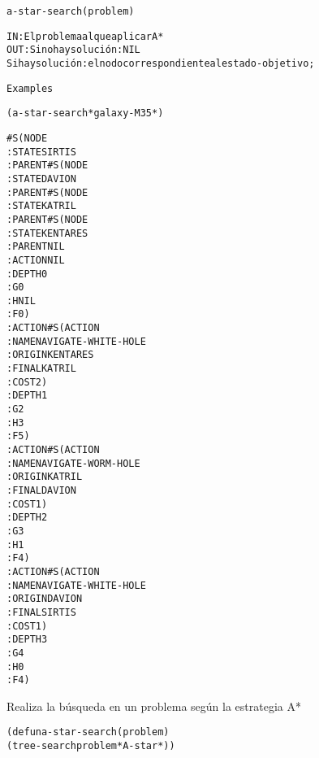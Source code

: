 \begin{aibox}{\function}
\begin{alltt}
a-star-search (problem)

  IN: El problema al que aplicar A*
  OUT: Si no hay solución: NIL
    Si hay solución: el nodo correspondiente al estado-objetivo ;

\end{alltt}
\end{aibox}

\begin{aibox}{\examples}
\begin{alltt}
Examples

(a-star-search *galaxy-M35*)

\#S(NODE
   :STATE SIRTIS
   :PARENT \#S(NODE
              :STATE DAVION
              :PARENT \#S(NODE
                         :STATE KATRIL
                         :PARENT \#S(NODE
                                    :STATE KENTARES
                                    :PARENT NIL
                                    :ACTION NIL
                                    :DEPTH 0
                                    :G 0
                                    :H NIL
                                    :F 0)
                         :ACTION \#S(ACTION
                                    :NAME NAVIGATE-WHITE-HOLE
                                    :ORIGIN KENTARES
                                    :FINAL KATRIL
                                    :COST 2)
                         :DEPTH 1
                         :G 2
                         :H 3
                         :F 5)
              :ACTION \#S(ACTION
                         :NAME NAVIGATE-WORM-HOLE
                         :ORIGIN KATRIL
                         :FINAL DAVION
                         :COST 1)
              :DEPTH 2
              :G 3
              :H 1
              :F 4)
   :ACTION \#S(ACTION
              :NAME NAVIGATE-WHITE-HOLE
              :ORIGIN DAVION
              :FINAL SIRTIS
              :COST 1)
   :DEPTH 3
   :G 4
   :H 0
   :F 4)


\end{alltt}
\end{aibox}

\begin{aibox}{\comments}
Realiza la búsqueda en un problema según la estrategia A*

\end{aibox}

\begin{aibox}{\pseudocode}
\begin{alltt}
  \end{alltt}
\end{aibox}

\begin{aibox}{\code}
\begin{alltt}

(defun a-star-search (problem)
    (tree-search problem *A-star*))

\end{alltt}
\end{aibox}

